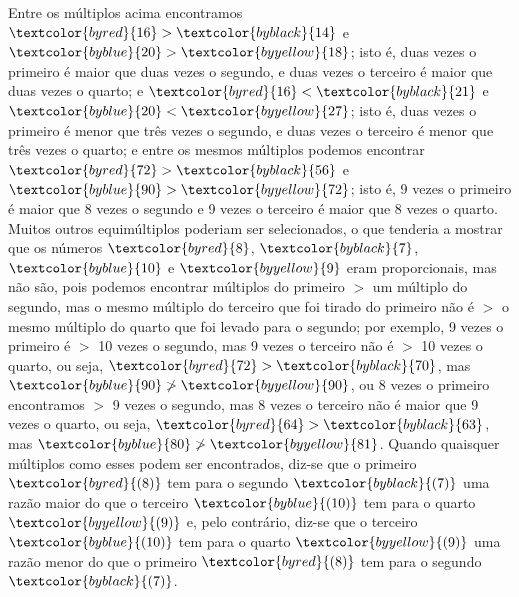 \documentclass[booklanguage=brazilian]{byrnebook}
\begin{document}
Entre os múltiplos acima encontramos $\textcolor{byred}{16} > \textcolor{byblack}{14}$ e $\textcolor{byblue}{20} > \textcolor{byyellow}{18}$; isto é, duas vezes o primeiro é maior que duas vezes o segundo, e duas vezes o terceiro é maior que duas vezes o quarto; e $\textcolor{byred}{16} < \textcolor{byblack}{21}$ e $\textcolor{byblue}{20} < \textcolor{byyellow}{27}$; isto é, duas vezes o primeiro é menor que três vezes o segundo, e duas vezes o terceiro é menor que três vezes o quarto; e entre os mesmos múltiplos podemos encontrar $\textcolor{byred}{72} > \textcolor{byblack}{56}$ e $\textcolor{byblue}{90} > \textcolor{byyellow}{72}$; isto é, 9 vezes o primeiro é maior que 8 vezes o segundo e 9 vezes o terceiro é maior que 8 vezes o quarto. Muitos outros equimúltiplos poderiam ser selecionados, o que tenderia a mostrar que os números $\textcolor{byred}{8}$, $\textcolor{byblack}{7}$, $\textcolor{byblue}{10}$ e $\textcolor{byyellow}{9}$ eram proporcionais, mas não são, pois podemos encontrar múltiplos do primeiro $>$ um múltiplo do segundo, mas o mesmo múltiplo do terceiro que foi tirado do primeiro não é $>$ o mesmo múltiplo do quarto que foi levado para o segundo; por exemplo, 9 vezes o primeiro é $>$ 10 vezes o segundo, mas 9 vezes o terceiro não é $>$ 10 vezes o quarto, ou seja, $\textcolor{byred}{72} > \textcolor{byblack}{70}$, mas $\textcolor{byblue}{90} \ngtr \textcolor{byyellow}{90}$, ou 8 vezes o primeiro encontramos $>$ 9 vezes o segundo, mas 8 vezes o terceiro não é maior que 9 vezes o quarto, ou seja, $\textcolor{byred}{64} > \textcolor{byblack}{63}$, mas $\textcolor{byblue}{80} \ngtr \textcolor{byyellow}{81}$. Quando quaisquer múltiplos como esses podem ser encontrados, diz-se que o primeiro $\textcolor{byred}{(8)}$ tem para o segundo $\textcolor{byblack}{(7)}$ uma razão maior do que o terceiro $\textcolor{byblue}{(10)}$ tem para o quarto $\textcolor{byyellow}{(9)}$ e, pelo contrário, diz-se que o terceiro $\textcolor{byblue}{(10)}$ tem para o quarto $\textcolor{byyellow}{(9)}$ uma razão menor do que o primeiro $\textcolor{byred}{(8)}$ tem para o segundo $\textcolor{byblack}{(7)}$.

\vfill\pagebreak

\label{prop:V.VIII}
\end{document}
